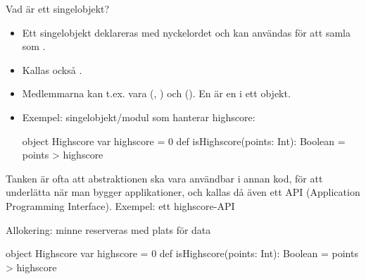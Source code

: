 
\begin{Slide}{Vad är ett singelobjekt?}
\begin{itemize}
\item Ett singelobjekt  deklareras med nyckelordet  och kan användas för att samla   som .
\item Kallas också .
\item Medlemmarna kan t.ex. vara  (, ) och  (). En  är en  i ett objekt.
\item Exempel: singelobjekt/modul som hanterar highscore:
\begin{Code}
object Highscore {
  var highscore = 0
  def isHighscore(points: Int): Boolean = points > highscore
}
\end{Code}
\end{itemize}
\pause
{\SlideFontSmall Tanken är ofta att abstraktionen ska vara användbar i annan kod, för att underlätta när man bygger applikationer, och kallas då även ett API (Application Programming Interface). Exempel: ett highscore-API}
\end{Slide}


\begin{Slide}{Allokering: minne reserveras med plats för data}
\begin{Code}
object Highscore {
  var highscore = 0
  def isHighscore(points: Int): Boolean = points > highscore
}
\end{Code}
\pause
{}
\end{Slide}


